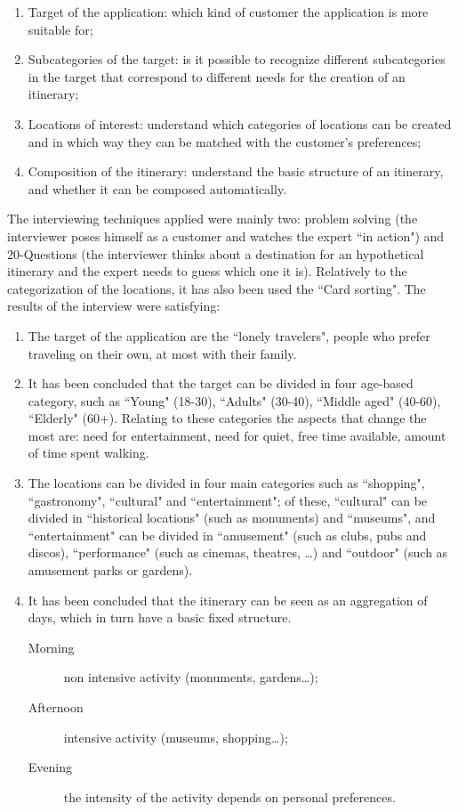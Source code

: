 \documentclass[11pt]{article} %
\begin{document}
\begin{enumerate}
  \item Target of the application: which kind of customer the application is more suitable for;
  \item Subcategories of the target: is it possible to recognize different subcategories in the target that correspond to different needs for the creation of an itinerary;
  \item Locations of interest: understand which categories of locations can be created and in which way they can be matched with the customer's preferences;
  \item Composition of the itinerary: understand the basic structure of an itinerary, and whether it can be composed automatically.
\end{enumerate}

The interviewing techniques applied were mainly two: problem solving (the interviewer poses himself as a customer and watches the expert ``in action") and 20-Questions (the interviewer thinks about a destination for an hypothetical itinerary and the expert needs to guess which one it is). Relatively to the categorization of the locations, it has also been used the ``Card sorting".
The results of the interview were satisfying:

\begin{enumerate}
  \item The target of the application are the ``lonely travelers", people who prefer traveling on their own, at most with their family.
  \item It has been concluded that the target can be divided in four age-based category, such as ``Young" (18-30), ``Adults" (30-40), ``Middle aged" (40-60), ``Elderly" (60+). Relating to these categories the aspects that change the most are: need for entertainment, need for quiet, free time available, amount of time spent walking.
  \item The locations can be divided in four main categories such as ``shopping", ``gastronomy", ``cultural" and ``entertainment"; of these, ``cultural" can be divided in ``historical locations" (such as monuments) and ``museums", and ``entertainment" can be divided in ``amusement" (such as clubs, pubs and discos), ``performance" (such as cinemas, theatres, \ldots)  and ``outdoor" (such as amusement parks or gardens).
  \item It has been concluded that the itinerary can be seen as an aggregation of days, which in turn have a basic fixed structure. 
\begin{description}
  \item[Morning] non intensive activity (monuments, gardens\ldots);
  \item[Afternoon] intensive activity (museums, shopping\ldots);
  \item[Evening] the intensity of the activity depends on personal preferences.
\end{description}
\end{enumerate}
\end{document}
